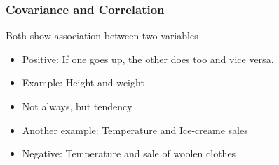 %
%
%
%
%
%
%
%
%
%
%
%
%
%
%
%


\begin{frame}[fragile]\frametitle{Covariance and Correlation}
Both show association between two variables
\begin{itemize}
\item Positive: If one goes up, the other does too and vice versa.
\item Example: Height and weight
\item Not always, but tendency
\item Another example: Temperature and Ice-creame sales
\item Negative: Temperature and sale of woolen clothes
\end{itemize}
\end{frame}

